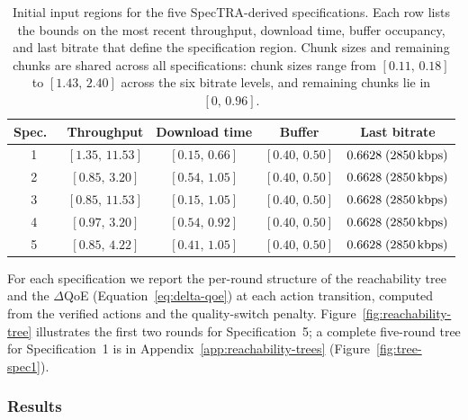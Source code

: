 \documentclass[thesis]{uofithesis} %
\begin{document}
    \begin{table}[t]
        \centering
        \caption{Initial input regions for the five SpecTRA-derived
            specifications.  Each row lists the bounds on the most recent
            throughput, download time, buffer occupancy, and last
            bitrate that define the specification region.
            Chunk sizes and remaining chunks are shared across all
            specifications: chunk sizes range from
            $[0.11,\, 0.18]$ to $[1.43,\, 2.40]$ across the six
            bitrate levels, and remaining chunks lie in $[0,\, 0.96]$.}
        \label{tab:spec-regions}
        \begin{tabular}{c c c c c}
            \hline
            Spec.\ & Throughput & Download time & Buffer & Last bitrate \\
            \hline
            1 & $[1.35,\, 11.53]$ & $[0.15,\, 0.66]$ & $[0.40,\, 0.50]$ & $0.6628\;(2850\text{\,kbps})$ \\
            2 & $[0.85,\, 3.20]$  & $[0.54,\, 1.05]$  & $[0.40,\, 0.50]$ & $0.6628\;(2850\text{\,kbps})$ \\
            3 & $[0.85,\, 11.53]$ & $[0.15,\, 1.05]$  & $[0.40,\, 0.50]$ & $0.6628\;(2850\text{\,kbps})$ \\
            4 & $[0.97,\, 3.20]$  & $[0.54,\, 0.92]$  & $[0.40,\, 0.50]$ & $0.6628\;(2850\text{\,kbps})$ \\
            5 & $[0.85,\, 4.22]$  & $[0.41,\, 1.05]$  & $[0.40,\, 0.50]$ & $0.6628\;(2850\text{\,kbps})$ \\
            \hline
        \end{tabular}
    \end{table}

    For each specification we report the per-round structure of the
    reachability tree and the $\Delta$QoE
    (Equation~\ref{eq:delta-qoe}) at each action transition,
    computed from the verified actions and the quality-switch penalty.
    Figure~\ref{fig:reachability-tree} illustrates the first two rounds
    for Specification~5; a complete five-round tree for
    Specification~1 is in Appendix~\ref{app:reachability-trees}
    (Figure~\ref{fig:tree-spec1}).


    \subsubsection{Results}
    \label{sec:verify-results-detail}
\end{document}

